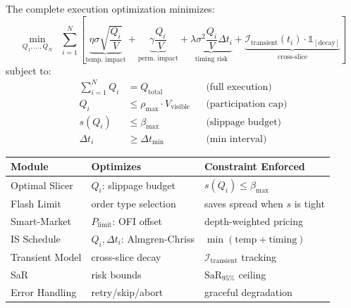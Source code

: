 \documentclass[11pt,a4paper]{article}
\begin{document}
\begin{formulabox}[title={\S12.1 — Global Objective Function}]
The complete execution optimization minimizes:
\begin{equation}
  \boxed{
  \min_{Q_1, \ldots, Q_N} \;\; \sum_{i=1}^{N} \left[
    \underbrace{\eta\sigma\sqrt{\frac{Q_i}{V}}}_{\text{temp.\ impact}}
    + \underbrace{\gamma\frac{Q_i}{V}}_{\text{perm.\ impact}}
    + \underbrace{\lambda\sigma^2\frac{Q_i}{V}\Delta t_i}_{\text{timing risk}}
    + \underbrace{\mathcal{I}_{\text{transient}}(t_i) \cdot \mathbb{1}_{[\text{decay}]}}_{\text{cross-slice}}
  \right]
  }
\end{equation}
subject to:
\begin{align}
  \sum_{i=1}^{N} Q_i &= Q_{\text{total}} & & \text{(full execution)} \\
  Q_i &\leq \rho_{\max} \cdot V_{\text{visible}} & & \text{(participation cap)} \\
  s(Q_i) &\leq \beta_{\max} & & \text{(slippage budget)} \\
  \Delta t_i &\geq \Delta t_{\min} & & \text{(min interval)}
\end{align}
\end{formulabox}

\begin{formulabox}[title={\S12.2 — How Each Module Optimizes This Objective}]
\begin{center}
\begin{tabular}{lll}
\toprule
\textbf{Module} & \textbf{Optimizes} & \textbf{Constraint Enforced} \\
\midrule
Optimal Slicer  & $Q_i$: slippage budget & $s(Q_i) \leq \beta_{\max}$ \\
Flash Limit     & order type selection  & saves spread when $s$ is tight \\
Smart-Market    & $P_{\text{limit}}$: OFI offset & depth-weighted pricing \\
IS Schedule     & $Q_i, \Delta t_i$: Almgren-Chriss & $\min(\text{temp} + \text{timing})$ \\
Transient Model & cross-slice decay     & $\mathcal{I}_{\text{transient}}$ tracking \\
SaR             & risk bounds           & $\text{SaR}_{95\%}$ ceiling \\
Error Handling  & retry/skip/abort      & graceful degradation \\
\bottomrule
\end{tabular}
\end{center}
\end{formulabox}
\end{document}
